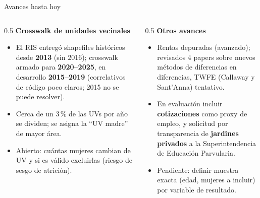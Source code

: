 \documentclass[aspectratio=169,10pt]{beamer}
\begin{document}
\begin{frame}{Avances hasta hoy}
\begingroup
{}
\begin{columns}[T]
\begin{column}{0.5\textwidth}
{\small\textcolor{steel}{\textbf{Crosswalk de unidades vecinales}}}
\begin{itemize}
  \footnotesize
  \item El RIS entregó shapefiles históricos desde \textbf{2013} (sin 2016); crosswalk armado para \textbf{2020--2025}, en desarrollo \textbf{2015--2019} (correlativos de código poco claros; 2015 no se puede resolver).
  \item Cerca de un 3\,\% de las UVs por año se dividen; se asigna la ``UV madre'' de mayor área.
  \item Abierto: cuántas mujeres cambian de UV y si es válido excluirlas (riesgo de sesgo de atrición).
\end{itemize}
\end{column}
\begin{column}{0.5\textwidth}
{\small\textcolor{steel}{\textbf{Otros avances}}}
\begin{itemize}
  \footnotesize
  \item Rentas depuradas (avanzado); revisados 4 papers sobre nuevos métodos de diferencias en diferencias, TWFE (Callaway y Sant'Anna) tentativo.
  \item En evaluación incluir \textbf{cotizaciones} como proxy de empleo, y solicitud por transparencia de \textbf{jardines privados} a la Superintendencia de Educación Parvularia.
  \item Pendiente: definir muestra exacta (edad, mujeres a incluir) por variable de resultado.
\end{itemize}
\end{column}
\end{columns}
\endgroup
\end{frame}
\end{document}
